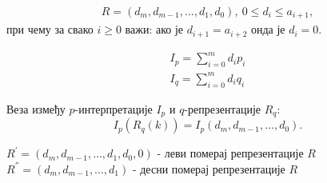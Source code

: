 \documentclass[10pt]{beamer}
\theoremstyle{remark}
\theoremstyle{definition}
\begin{document}
	\begin{frame}
		\begin{tcolorbox}[title=Репрезентација $ R $ је  $ (m+1) $-торка за коју важи:]
			\begin{eqnarray}
			R = (d_{m}, d_{m-1}, \ldots , d_{1}, d_{0}), \ 0 \leq d_{i} \leq a_{i+1},
			\end{eqnarray}
			при чему за свако $ i \geq 0 $ важи: ако је $ d_{i+1} = a_{i+2} $ онда је $ d_{i} = 0 $.
		\end{tcolorbox}
	
		\begin{tcolorbox}[title=$ p $-интерпретација и $ q $-интерпретација репрезентације $ R $]
			\begin{eqnarray}
				I_{p} = \sum_{i=0}^{m} d_{i}p_{i}\\
				I_{q} = \sum_{i=0}^{m} d_{i}q_{i}
			\end{eqnarray} 	
		\end{tcolorbox}
	\end{frame}
	\begin{frame}
		
		Веза између $ p $-интерпретације $ I_{p} $ и $ q $-репрезентације $ R_{q} $:
			\begin{displaymath}
			I_{p}(R_{q}(k)) = I_{p}(d_{m}, d_{m-1}, \ldots, d_{0}).
			\end{displaymath}
			
		$ R^{'} = (d_{m}, d_{m-1}, \ldots , d_{1}, d_{0}, 0) $ - леви померај репрезентације $ R $\\
		$ R^{''} = (d_{m}, d_{m-1}, \ldots , d_{1}) $ - десни померај репрезентације $ R $		
	\end{frame}
	
\end{document}
